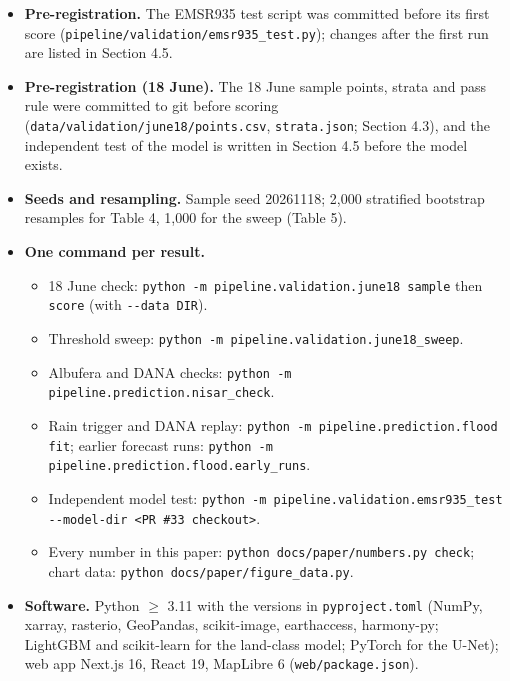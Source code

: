 \documentclass[10pt,twocolumn]{article}
\begin{document}
\begin{itemize}
\item{} \checkmark{} \textbf{Pre-registration.} The EMSR935 test script was committed before its first score (\texttt{pipeline/\allowbreak{}validation/\allowbreak{}emsr935\_\allowbreak{}test.\allowbreak{}py}); changes after the first run are listed in Section 4.5.
\item{} \checkmark{} \textbf{Pre-registration (18 June).} The 18 June sample points, strata and pass rule were committed to git before scoring (\texttt{data/\allowbreak{}validation/\allowbreak{}june18/\allowbreak{}points.\allowbreak{}csv}, \texttt{strata.\allowbreak{}json}; Section 4.3), and the independent test of the model is written in Section 4.5 before the model exists.
\item{} \checkmark{} \textbf{Seeds and resampling.} Sample seed 20261118; 2,000 stratified bootstrap resamples for Table 4, 1,000 for the sweep (Table 5).
\item{} \checkmark{} \textbf{One command per result.}
\begin{itemize}
\item{} 18 June check: \texttt{python -\allowbreak{}m pipeline.\allowbreak{}validation.\allowbreak{}june18 sample} then \texttt{score} (with \texttt{-\allowbreak{}-\allowbreak{}data DIR}).
\item{} Threshold sweep: \texttt{python -\allowbreak{}m pipeline.\allowbreak{}validation.\allowbreak{}june18\_\allowbreak{}sweep}.
\item{} Albufera and DANA checks: \texttt{python -\allowbreak{}m pipeline.\allowbreak{}prediction.\allowbreak{}nisar\_\allowbreak{}check}.
\item{} Rain trigger and DANA replay: \texttt{python -\allowbreak{}m pipeline.\allowbreak{}prediction.\allowbreak{}flood fit}; earlier forecast runs: \texttt{python -\allowbreak{}m pipeline.\allowbreak{}prediction.\allowbreak{}flood.\allowbreak{}early\_\allowbreak{}runs}.
\item{} Independent model test: \texttt{python -\allowbreak{}m pipeline.\allowbreak{}validation.\allowbreak{}emsr935\_\allowbreak{}test -\allowbreak{}-\allowbreak{}model-\allowbreak{}dir <PR \#33 checkout>}.
\item{} Every number in this paper: \texttt{python docs/\allowbreak{}paper/\allowbreak{}numbers.\allowbreak{}py check}; chart data: \texttt{python docs/\allowbreak{}paper/\allowbreak{}figure\_\allowbreak{}data.\allowbreak{}py}.
\end{itemize}
\item{} \checkmark{} \textbf{Software.} Python $\geq$ 3.11 with the versions in \texttt{pyproject.\allowbreak{}toml} (NumPy, xarray, rasterio, GeoPandas, scikit-image, earthaccess, harmony-py; LightGBM and scikit-learn for the land-class model; PyTorch for the U-Net); web app Next.js 16, React 19, MapLibre 6 (\texttt{web/\allowbreak{}package.\allowbreak{}json}).

\end{itemize}
\end{document}
